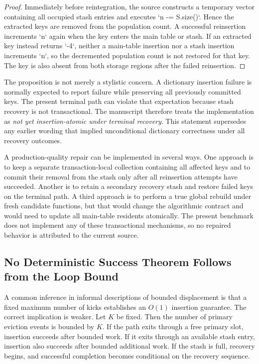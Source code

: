 \documentclass[conference]{IEEEtran}
\begin{document}
\begin{proof}
Immediately before reintegration, the source constructs a temporary vector containing all occupied stash entries and executes `n -= S.size()`. Hence the extracted keys are removed from the population count. A successful reinsertion increments `n` again when the key enters the main table or stash. If an extracted key instead returns `-4`, neither a main-table insertion nor a stash insertion increments `n`, so the decremented population count is not restored for that key. The key is also absent from both storage regions after the failed reinsertion.
\end{proof}

The proposition is not merely a stylistic concern. A dictionary insertion failure is normally expected to report failure while preserving all previously committed keys. The present terminal path can violate that expectation because stash recovery is not transactional. The manuscript therefore treats the implementation as \emph{not yet insertion-atomic under terminal recovery}. This statement supersedes any earlier wording that implied unconditional dictionary correctness under all recovery outcomes.

A production-quality repair can be implemented in several ways. One approach is to keep a separate transaction-local collection containing all affected keys and to commit their removal from the stash only after all reinsertion attempts have succeeded. Another is to retain a secondary recovery stash and restore failed keys on the terminal path. A third approach is to perform a true global rebuild under fresh candidate functions, but that would change the algorithmic contract and would need to update all main-table residents atomically. The present benchmark does not implement any of these transactional mechanisms, so no repaired behavior is attributed to the current source.

\subsection{No Deterministic Success Theorem Follows from the Loop Bound}

A common inference in informal descriptions of bounded displacement is that a fixed maximum number of kicks establishes an $O(1)$ insertion guarantee. The correct implication is weaker. Let $K$ be fixed. Then the number of primary eviction events is bounded by $K$. If the path exits through a free primary slot, insertion succeeds after bounded work. If it exits through an available stash entry, insertion also succeeds after bounded additional work. If the stash is full, recovery begins, and successful completion becomes conditional on the recovery sequence.
\end{document}
